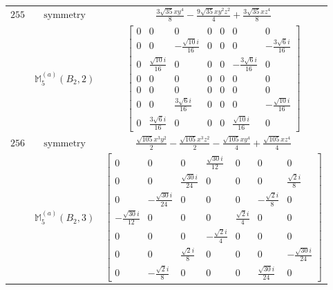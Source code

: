 \documentclass[fleqn,8pt,landscape]{jsarticle}
\begin{document}
\begin{longtable}{ccc}
$ 255 $ & $ \text{symmetry} $ & $ \frac{3 \sqrt{35} x y^{4}}{8} - \frac{9 \sqrt{35} x y^{2} z^{2}}{4} + \frac{3 \sqrt{35} x z^{4}}{8} $ \\
$  $ & $ \mathbb{M}_{5}^{(a)}(B_{2},2) $ & $ \begin{bmatrix} 0 & 0 & 0 & 0 & 0 & 0 & 0 \\ 0 & 0 & - \frac{\sqrt{10} i}{16} & 0 & 0 & 0 & - \frac{3 \sqrt{6} i}{16} \\ 0 & \frac{\sqrt{10} i}{16} & 0 & 0 & 0 & - \frac{3 \sqrt{6} i}{16} & 0 \\ 0 & 0 & 0 & 0 & 0 & 0 & 0 \\ 0 & 0 & 0 & 0 & 0 & 0 & 0 \\ 0 & 0 & \frac{3 \sqrt{6} i}{16} & 0 & 0 & 0 & - \frac{\sqrt{10} i}{16} \\ 0 & \frac{3 \sqrt{6} i}{16} & 0 & 0 & 0 & \frac{\sqrt{10} i}{16} & 0 \end{bmatrix} $ \\ \hline
$ 256 $ & $ \text{symmetry} $ & $ \frac{\sqrt{105} x^{3} y^{2}}{2} - \frac{\sqrt{105} x^{3} z^{2}}{2} - \frac{\sqrt{105} x y^{4}}{4} + \frac{\sqrt{105} x z^{4}}{4} $ \\
$  $ & $ \mathbb{M}_{5}^{(a)}(B_{2},3) $ & $ \begin{bmatrix} 0 & 0 & 0 & \frac{\sqrt{30} i}{12} & 0 & 0 & 0 \\ 0 & 0 & \frac{\sqrt{30} i}{24} & 0 & 0 & 0 & \frac{\sqrt{2} i}{8} \\ 0 & - \frac{\sqrt{30} i}{24} & 0 & 0 & 0 & - \frac{\sqrt{2} i}{8} & 0 \\ - \frac{\sqrt{30} i}{12} & 0 & 0 & 0 & \frac{\sqrt{2} i}{4} & 0 & 0 \\ 0 & 0 & 0 & - \frac{\sqrt{2} i}{4} & 0 & 0 & 0 \\ 0 & 0 & \frac{\sqrt{2} i}{8} & 0 & 0 & 0 & - \frac{\sqrt{30} i}{24} \\ 0 & - \frac{\sqrt{2} i}{8} & 0 & 0 & 0 & \frac{\sqrt{30} i}{24} & 0 \end{bmatrix} $ \\ \hline
\end{longtable}
\end{document}
